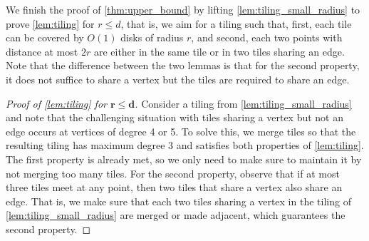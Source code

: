 \documentclass[a4paper,english,cleveref,thm-restate]{lipics-v2021}
\begin{document}
We finish the proof of \cref{thm:upper_bound} by lifting \cref{lem:tiling_small_radius} to prove \cref{lem:tiling} for $ r \leq d $, that is, we aim for a tiling such that, first, each tile can be covered by $ O(1) $ disks of radius $ r $, and second, each two points with distance at most $ 2r $ are either in the same tile or in two tiles sharing an edge.
Note that the difference between the two lemmas is that for the second property, it does not suffice to share a vertex but the tiles are required to share an edge.

\begin{proof}[Proof of \cref{lem:tiling} for $ \bm{r \leq d} $]
    Consider a tiling from \cref{lem:tiling_small_radius} and note that the challenging situation with tiles sharing a vertex but not an edge occurs at vertices of degree 4 or 5.
    To solve this, we merge tiles so that the resulting tiling has maximum degree 3 and satisfies both properties of \cref{lem:tiling}.
    The first property is already met, so we only need to make sure to maintain it by not merging too many tiles.
    For the second property, observe that if at most three tiles meet at any point, then two tiles that share a vertex also share an edge.
    That is, we make sure that each two tiles sharing a vertex in the tiling of \cref{lem:tiling_small_radius} are merged or made adjacent, which guarantees the second property.
    


\end{proof}
\end{document}
